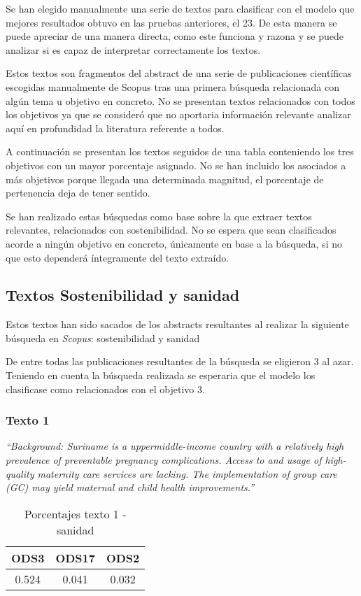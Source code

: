 Se han elegido manualmente una serie de textos para clasificar con el modelo que
mejores resultados obtuvo en las pruebas anteriores, el 23. De esta manera se
puede apreciar de una manera directa, como este funciona y razona y se puede
analizar si es capaz de interpretar correctamente los textos.

Estos textos son fragmentos del abstract de una serie de publicaciones
científicas escogidas manualmente de Scopus tras una primera búsqueda
relacionada con algún tema u objetivo en concreto. No se presentan textos
relacionados con todos los objetivos ya que se consideró que no aportaria
información relevante analizar aquí en profundidad la literatura referente a
todos.

A continuación se presentan los textos seguidos de una tabla conteniendo los
tres objetivos con un mayor porcentaje asignado. No se han incluido los
asociados a más objetivos porque llegada una determinada magnitud, el porcentaje
de pertenencia deja de tener sentido.

Se han realizado estas búsquedas como base sobre la que extraer textos
relevantes, relacionados con sostenibilidad. No se espera que sean clasificados
acorde a ningún objetivo en concreto, únicamente en base a la búsqueda, si no
que esto dependerá íntegramente del texto extraído. 

\subsection{Textos Sostenibilidad y sanidad}
Estos textos han sido sacados de los abstracts resultantes al realizar la
siguiente búsqueda en \textit{Scopus}: sostenibilidad y sanidad

De entre todas las publicaciones resultantes de la búsqueda se eligieron 3 al
azar. Teniendo en cuenta la búsqueda realizada se esperaria que el modelo los
clasificase como relacionados con el objetivo 3.

\subsubsection{Texto 1}
\begin{center}
    \textit{``Background: Suriname is a uppermiddle-income country with a relatively
    high prevalence of preventable pregnancy complications. Access to and usage
    of high-quality maternity care services are lacking. The implementation of
    group care (GC) may yield maternal and child health
    improvements.''}\cite{validationtexts1}
    \begin{table}[H]
            \begin{tabular}{c | c | c }
                \hline
                ODS3 & ODS17 & ODS2\\ \hline
                0.524 & 0.041 & 0.032\\ \hline
            \end{tabular}%
            \caption{Porcentajes texto 1 - sanidad}
    \end{table}
\end{center}

